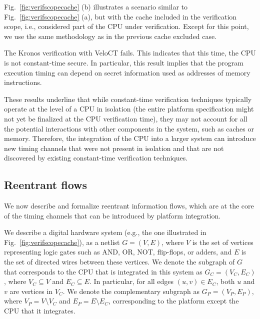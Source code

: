 Fig.~\ref{fig:verifscopecache} (b) illustrates a scenario similar to Fig.~\ref{fig:verifscopecache} (a), but with the cache included in the verification scope, i.e., considered part of the CPU under verification.
Except for this point, we use the same methodology as in the previous cache excluded case.

The Kronos verification with VeloCT fails.
This indicates that this time, the CPU is not constant-time secure.
In particular, this result implies that the program execution timing can depend on secret information used as addresses of memory instructions.

These results underline that while constant-time verification techniques typically operate at the level of a CPU in isolation (the entire platform specification might not yet be finalized at the CPU verification time), they may not account for all the potential interactions with other components in the system, such as caches or memory.
Therefore, the integration of the CPU into a larger system can introduce new timing channels that were not present in isolation and that are not discovered by existing constant-time verification techniques.

\subsection{Reentrant flows}

We now describe and formalize reentrant information flows, which are at the core of the timing channels that can be introduced by platform integration.

We describe a digital hardware system (e.g., the one illustrated in Fig.~\ref{fig:verifscopecache}), as a netlist $G = (V, E)$, where $V$ is the set of vertices representing logic gates such as AND, OR, NOT, flip-flops, or adders, and $E$ is the set of directed wires between these vertices.
We denote the subgraph of $G$ that corresponds to the CPU that is integrated in this system as $G_C = (V_C, E_C)$, where $V_C \subseteq V$ and $E_C \subseteq E$.
In particular, for all edges $(u, v) \in E_C$, both $u$ and $v$ are vertices in $V_C$.
We denote the complementary subgraph as $G_{P} = (V_{P}, E_{P})$, where $V_{P} = V \setminus V_C$ and $E_{P} = E \setminus E_C$, corresponding to the platform except the CPU that it integrates.

